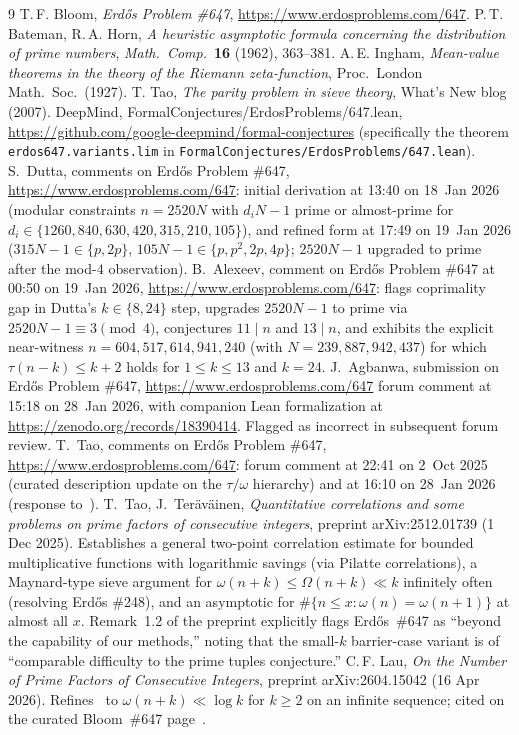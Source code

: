 \documentclass[11pt]{article}
\renewcommand{\_}{\origunderscore\allowbreak}
\theoremstyle{definition}
\theoremstyle{remark}
\begin{document}
\begin{thebibliography}{9}
 T.\,F. Bloom, \emph{Erd\H{o}s Problem \#647},
\url{https://www.erdosproblems.com/647}.
 P.\,T. Bateman, R.\,A. Horn, \emph{A heuristic
asymptotic formula concerning the distribution of prime numbers},
\emph{Math.\ Comp.}\ \textbf{16} (1962), 363--381.
 A.\,E. Ingham, \emph{Mean-value theorems in the theory
of the Riemann zeta-function}, Proc.\ London Math.\ Soc.\ (1927).
 T. Tao, \emph{The parity problem in sieve theory},
What's New blog (2007).
 DeepMind, FormalConjectures/ErdosProblems/647.lean,
\url{https://github.com/google-deepmind/formal-conjectures} (specifically the theorem \texttt{erdos\_647.variants.lim} in \texttt{FormalConjectures/ErdosProblems/647.lean}).
 S.~Dutta, comments on Erd\H{o}s Problem \#647,
\url{https://www.erdosproblems.com/647}: initial derivation at
13:40 on 18~Jan 2026 (modular constraints $n=2520N$ with
$d_iN-1$ prime or almost-prime for $d_i\in\{1260,840,630,420,
315,210,105\}$), and refined form at 17:49 on 19~Jan 2026
($315N-1\in\{p,2p\}$, $105N-1\in\{p,p^{2},2p,4p\}$;
$2520N-1$ upgraded to prime after the mod-$4$ observation).
 B.~Alexeev, comment on Erd\H{o}s Problem \#647
at 00:50 on 19~Jan 2026,
\url{https://www.erdosproblems.com/647}: flags coprimality gap in
Dutta's $k\in\{8,24\}$ step, upgrades $2520N-1$ to prime via
$2520N-1\equiv 3\pmod 4$, conjectures $11\mid n$ and $13\mid n$,
and exhibits the explicit near-witness
$n = 604{,}517{,}614{,}941{,}240$ (with $N=239{,}887{,}942{,}437$)
for which $\tau(n-k)\le k+2$ holds for $1\le k\le 13$ and $k=24$.
 J.~Agbanwa, submission on Erd\H{o}s Problem \#647,
\url{https://www.erdosproblems.com/647} forum comment at 15:18 on
28~Jan 2026, with companion Lean formalization at
\url{https://zenodo.org/records/18390414}. Flagged as incorrect in
subsequent forum review.
 T.~Tao, comments on Erd\H{o}s Problem \#647,
\url{https://www.erdosproblems.com/647}: forum comment at 22:41 on
2~Oct 2025 (curated description update on the $\tau/\omega$
hierarchy) and at 16:10 on 28~Jan 2026 (response to~\cite{Agbanwa}).
 T.~Tao, J.~Ter\"av\"ainen,
\emph{Quantitative correlations and some problems on prime factors
of consecutive integers}, preprint arXiv:2512.01739 (1 Dec 2025).
Establishes a general two-point correlation estimate for bounded
multiplicative functions with logarithmic savings (via Pilatte
correlations), a Maynard-type sieve argument for
$\omega(n+k)\le\Omega(n+k)\ll k$ infinitely often (resolving Erd\H{o}s
\#248), and an asymptotic for $\#\{n\le x:\omega(n)=\omega(n+1)\}$ at
almost all $x$. Remark~1.2 of the preprint explicitly flags
Erd\H{o}s~\#647 as ``beyond the capability of our methods,'' noting
that the small-$k$ barrier-case variant is of ``comparable difficulty
to the prime tuples conjecture.''
 C.\,F. Lau, \emph{On the Number of Prime Factors of
Consecutive Integers}, preprint arXiv:2604.15042 (16 Apr 2026).
Refines~\cite{TaoTeravainen2025} to $\omega(n+k)\ll\log k$ for
$k\ge 2$ on an infinite sequence; cited on the curated Bloom~\#647
page~\cite{Bloom647}.
\end{thebibliography}
\end{document}
